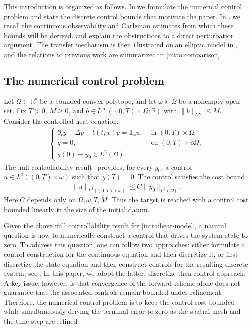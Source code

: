 \documentclass[print,wide,eng]{draft}
\begin{document}
This introduction is organized as follows. In  we formulate the numerical control problem and state the discrete control bounds that motivate the paper. In , we recall the continuous observability and Carleman estimates from which these bounds will be derived, and explain the obstructions to a direct perturbation argument. The transfer mechanism is then illustrated on an elliptic model in , and the relations to previous work are summarized in \cref{intro:comparison}.


\subsection{The numerical control problem}\label{intro:heat}


Let $\Omega\subset\mathbb R^d$ be a bounded convex polytope, and let $\omega\Subset\Omega$ be a nonempty open set.
Fix $T>0$, $M\geq0$, and  $b\in L^\infty((0,T)\times\Omega;\mathbb R)$ with $\|b\|_{L^\infty}\leq M$.
Consider the controlled heat equation:
%
\begin{align}\label{intro:heat-model}
\begin{cases}
\partial_t y-\Delta y+b(t,x)y=\mathbf1_\omega u,& \text{ in } (0,T)\times\Omega,\\
y=0,& \text{ on } (0,T)\times\partial\Omega,\\
y(0)=y_0\in L^2(\Omega).
\end{cases}
\end{align}
The null controllability result~\cite{Fursikov1996} provides, for every $y_0$, a control $u\in L^2((0,T)\times\omega)$ such that
$ y(T)=0$.
The control satisfies the cost bound
\begin{align}\label{intro:continuous-cost}
\|u\|_{L^2((0,T)\times\omega)}\leq C\|y_0\|_{L^2(\Omega)}.
\end{align}
Here $C$ depends only on $\Omega,\omega,T,M$.
Thus the target is reached with a control cost bounded linearly in the size of the initial datum.

Given the above null controllability result for \eqref{intro:heat-model}, a natural question is how to numerically construct a control that drives the system state to zero. To address this question, one can follow two approaches: either formulate a control construction for the continuous equation and then discretize it, or first discretize the state equation and then construct controls for the resulting discrete system; see \cite[Section~1]{Zuazua2005}. In this paper, we adopt the latter, discretize-then-control approach. A key issue, however, is that convergence of the forward scheme alone does not guarantee that the associated controls remain bounded under refinement. Therefore, the numerical control problem is to keep the control cost bounded while simultaneously driving the terminal error to zero as the spatial mesh and the time step are refined.
\end{document}
